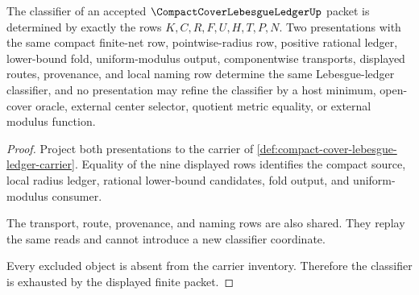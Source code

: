 \begin{theorem}
\label{thm:compact-cover-lebesgue-ledger-classifier-surface}
The classifier of an accepted $\CompactCoverLebesgueLedgerUp$ packet is determined by exactly the rows $K,C,R,F,U,H,T,P,N$. Two presentations with the same compact finite-net row, pointwise-radius row, positive rational ledger, lower-bound fold, uniform-modulus output, componentwise transports, displayed routes, provenance, and local naming row determine the same Lebesgue-ledger classifier, and no presentation may refine the classifier by a host minimum, open-cover oracle, external center selector, quotient metric equality, or external modulus function.
\end{theorem}
\begin{proof}
Project both presentations to the carrier of \autoref{def:compact-cover-lebesgue-ledger-carrier}. Equality of the nine displayed rows identifies the compact source, local radius ledger, rational lower-bound candidates, fold output, and uniform-modulus consumer.

The transport, route, provenance, and naming rows are also shared. They replay the same reads and cannot introduce a new classifier coordinate.

Every excluded object is absent from the carrier inventory. Therefore the classifier is exhausted by the displayed finite packet.
\end{proof}

